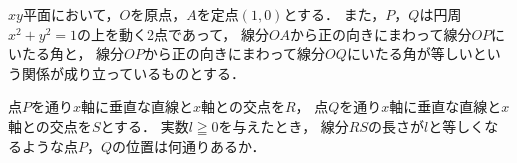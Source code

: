 \documentclass[../../main.tex]{subfiles}
\begin{document}
$xy$平面において，$O$を原点，$A$を定点$(1,0)$とする．
また，$P$，$Q$は円周$x^2+y^2=1$の上を動く2点であって，
線分$OA$から正の向きにまわって線分$OP$にいたる角と，
線分$OP$から正の向きにまわって線分$OQ$にいたる角が等しいという関係が成り立っているものとする．

点$P$を通り$x$軸に垂直な直線と$x$軸との交点を$R$，
点$Q$を通り$x$軸に垂直な直線と$x$軸との交点を$S$とする．
実数$l \geqq 0$を与えたとき，
線分$RS$の長さが$l$と等しくなるような点$P$，$Q$の位置は何通りあるか．
\end{document}
